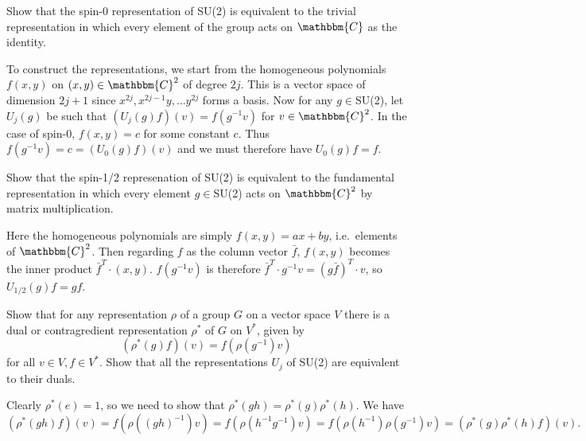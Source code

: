 \begin{p}%
{Show that the spin-0 representation of SU(2) is equivalent to the trivial representation in which every element of the group acts on $\mathbbm{C}$ as the identity.}
\end{p}
{To construct the representations, we 
start from the homogeneous polynomials $f(x,y)$ on $(x,y)\in\mathbbm{C}^2$ of degree $2j$. This is a 
vector space of dimension $2j+1$ since $x^{2j},x^{2j-1}y,\dots y^{2j}$ forms a basis. 
Now for any $g\in$SU(2), let $U_j(g)$ be such that $(U_j(g)f)(v)=f(g^{-1}v)$ for $v\in\mathbbm{C}^2$. 
In the case of spin-0, $f(x,y)=c$ for some constant $c$. Thus $f(g^{-1}v)=c=(U_0(g)f)(v)$ 
and we must therefore have $U_0(g)f=f$.}

\begin{p}%
{Show that the spin-1/2 represenation of SU(2) is equivalent to the fundamental representation in which every element $g\in$SU(2) acts on $\mathbbm{C}^2$ by matrix multiplication.}
\end{p}
{Here the 
homogeneous polynomials are simply $f(x,y)=ax+by$, i.e.~elements of $\mathbbm{C}^2$. Then regarding
$f$ as the column vector $\bar{f}$, $f(x,y)$ becomes the inner product $\bar{f}^T\cdot(x,y)$. 
$f(g^{-1}v)$ is therefore $\bar{f}^T\cdot g^{-1}v=(g\bar{f})^T\cdot v$, so $U_{1/2}(g)f=gf$.}

\begin{p}%
{Show that for any representation $\rho$ of a group $G$ on a vector space $V$ there is a dual or 
contragredient representation $\rho^*$ of $G$ on $V^*$, given by 
\[(\rho^*(g)f)(v)=f(\rho(g^{-1})v)\] for all $v\in V, f\in V^*$. 
Show that all the representations $U_j$ of 
SU(2) are equivalent to their duals.}
\end{p}
{Clearly $\rho^*(e)=1$, so we need to show that $\rho^*(gh)=\rho^*(g)\rho^*(h)$. We have $(\rho^*(gh)f)(v)=f(\rho((gh)^{-1})v)=f(\rho(h^{-1}g^{-1})v)=f(\rho(h^{-1})\rho(g^{-1})v)=(\rho^*(g)\rho^*(h)f)(v).$ }

